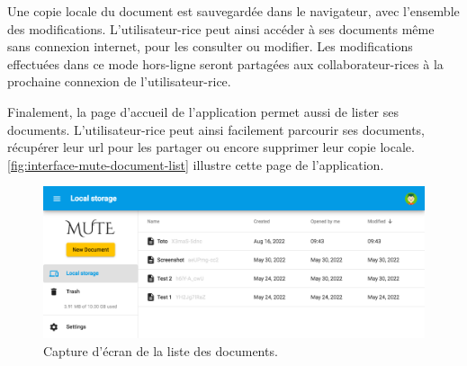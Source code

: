 Une copie locale du document est sauvegardée dans le navigateur, avec l'ensemble des modifications.
L'utilisateur-rice peut ainsi accéder à ses documents même sans connexion internet, pour les consulter ou modifier.
Les modifications effectuées dans ce mode hors-ligne seront partagées aux collaborateur-rices à la prochaine connexion de l'utilisateur-rice.

Finalement, la page d'accueil de l'application permet aussi de lister ses documents.
L'utilisateur-rice peut ainsi facilement parcourir ses documents, récupérer leur url pour les partager ou encore supprimer leur copie locale.
\autoref{fig:interface-mute-document-list} illustre cette page de l'application.
\begin{figure}[!ht]
    \centering
    \includegraphics[width=\linewidth]{img/screenshot-mute-document-list.png}
    \caption{Capture d'écran de la liste des documents.}
    \label{fig:interface-mute-document-list}
\end{figure}

